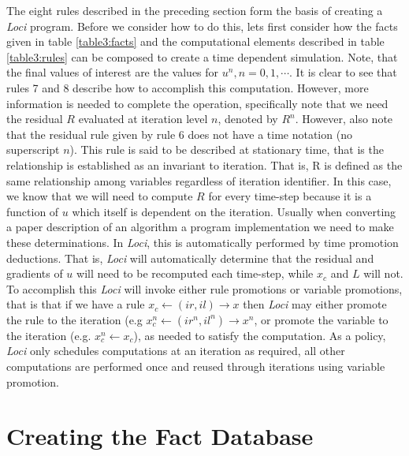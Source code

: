 \documentclass[10pt,epsf]{book}
\begin{document}
The eight rules described in the preceding section form the basis of
creating a {\it Loci} program.  Before we consider how to do this, lets
first consider how the facts given in table \ref{table3:facts} and the
computational elements described in table \ref{table3:rules} can be
composed to create a time dependent simulation.  Note, that the final
values of interest are the values for $u^n, n=0,1, \cdots$.  It is
clear to see that rules 7 and 8 describe how to accomplish this
computation.  However, more information is needed to complete the
operation, specifically note that we need the residual $R$ evaluated
at iteration level $n$, denoted by $R^n$.  However, also note that the
residual rule given by rule 6 does not have a time notation (no
superscript $n$).  This rule is said to be described at stationary
time, that is the relationship is established as an invariant to
iteration.  That is, R is defined as the same relationship among
variables regardless of iteration identifier.  In this case, we know
that we will need to compute $R$ for every time-step because it is a
function of $u$ which itself is dependent on the iteration.  Usually
when converting a paper description of an algorithm a program
implementation we need to make these determinations.  In {\it Loci}, this is
automatically performed by time promotion deductions.  That is, {\it Loci}
will automatically determine that the residual and gradients of $u$
will need to be recomputed each time-step, while $x_c$ and $L$ will
not.  To accomplish this {\it Loci} will invoke either rule promotions or
variable promotions, that is that if we have a rule
$x_c\leftarrow(ir,il)\rightarrow x$ then {\it Loci} may either promote the
rule to the iteration (e.g $x_c^n\leftarrow(ir^n,il^n)\rightarrow
x^n$, or promote the variable to the iteration (e.g. $x_c^n\leftarrow
x_c$), as needed to satisfy the computation.  As a policy, {\it Loci} only
schedules computations at an iteration as required, all other
computations are performed once and reused through iterations using
variable promotion.

\section{Creating the Fact Database}
\end{document}
